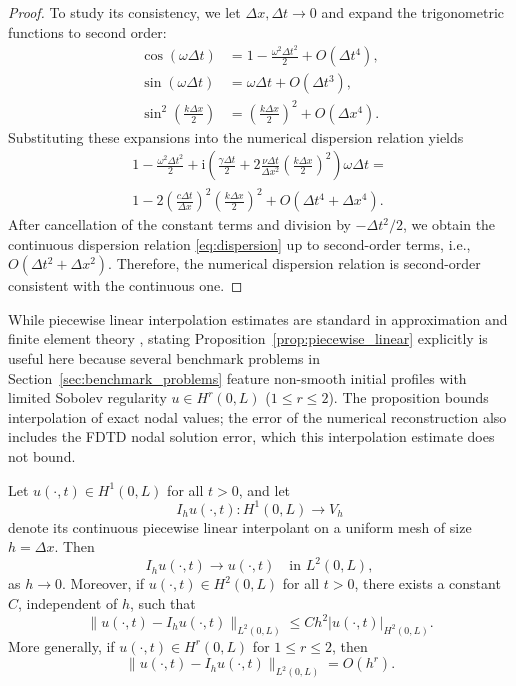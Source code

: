 \documentclass{Configuration_Files/PoliMi3i_thesis}
\newif\ifshowthesischanges
\DeclareRobustCommand{\thesischange}[2]{%
    \ifshowthesischanges
        \textcolor{#1}{#2}%
    \else
        #2%
    \fi
}
\def\thesischange#1#2{#2}%
\begin{document}
\begin{proof}
To study its consistency, we let $\Delta x,\Delta t\rightarrow0$ and expand the
trigonometric functions to second order:
\begin{align*}
\cos(\omega\Delta t)
&=
1-\frac{\omega^2\Delta t^2}{2}
+
O(\Delta t^4),\\
\sin(\omega\Delta t)
&=
\omega\Delta t
+
O(\Delta t^3),\\
\sin^2\!\left(\frac{k\Delta x}{2}\right)
&=
\left(\frac{k\Delta x}{2}\right)^2
+
O(\Delta x^4).
\end{align*}
Substituting these expansions into the numerical dispersion relation yields
\begin{multline}
1
-
\frac{\omega^2\Delta t^2}{2}
+
\mathrm{i}
\left(
\frac{\gamma\Delta t}{2}
+
2\frac{\nu\Delta t}{\Delta x^2}
\left(\frac{k\Delta x}{2}\right)^2
\right)
\omega\Delta t
= \\
1
-
2
\left(
\frac{c\Delta t}{\Delta x}
\right)^2
\left(\frac{k\Delta x}{2}\right)^2
+
O(\Delta t^4+\Delta x^4).
\end{multline}
After cancellation of the constant terms and division by
$-\Delta t^2/2$, we obtain the continuous dispersion relation \eqref{eq:dispersion} up to second-order terms, i.e., \(O(\Delta t^2+\Delta x^2)\). Therefore, the numerical dispersion relation is second-order consistent
with the continuous one.
\end{proof}

\thesischange{red}{While piecewise linear interpolation estimates are standard in approximation and finite element theory \citep{quarteroni_numerical_2007}, stating Proposition~\ref{prop:piecewise_linear} explicitly is useful here because several benchmark problems in Section~\ref{sec:benchmark_problems} feature non-smooth initial profiles with limited Sobolev regularity $u \in H^r(0,L)$ ($1 \le r \le 2$). The proposition bounds interpolation of exact nodal values; the error of the numerical reconstruction also includes the FDTD nodal solution error, which this interpolation estimate does not bound.}

\begin{proposition} \label{prop:piecewise_linear}
Let $u(\cdot,t) \in H^1(0,L)$ for all $t > 0$, and let
\[
I_h u(\cdot,t) : H^1(0,L) \to V_h
\]
denote its continuous piecewise linear interpolant on a uniform mesh of size $h = \Delta x$. Then
\[
I_h u(\cdot,t) \to u(\cdot,t) \quad \text{in } L^2(0,L),
\]
as $h \to 0$. Moreover, if $u(\cdot,t) \in H^2(0,L)$ for all $t > 0$, there exists a constant $C$, independent of $h$, such that
\[
\|u(\cdot,t) - I_h u(\cdot,t)\|_{L^2(0,L)} \le Ch^2 |u(\cdot,t)|_{H^2(0,L)}.
\]
More generally, if $u(\cdot,t) \in H^r(0,L)$ for $1 \le r \le 2$, then
\[
\|u(\cdot,t) - I_h u(\cdot,t)\|_{L^2(0,L)} = O(h^r).
\]
\end{proposition}
\end{document}
